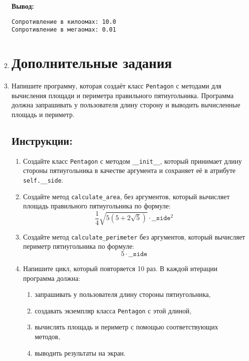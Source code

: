 \begin{enumerate}
\textbf{Вывод:}
\begin{verbatim}
Сопротивление в килоомах: 10.0
Сопротивление в мегаомах: 0.01
\end{verbatim}

\item 


\section*{Дополнительные задания}

\item
Напишите программу, которая создаёт класс \texttt{Pentagon} с методами для вычисления площади
и периметра правильного пятиугольника. Программа должна запрашивать у пользователя длину сторону
и выводить вычисленные площадь и периметр.

\subsection*{Инструкции:}
\begin{enumerate}
\item Создайте класс \texttt{Pentagon} с методом
\texttt{\_\_init\_\_}, который принимает длину стороны пятиугольника в
качестве аргумента и сохраняет её в атрибуте \texttt{self.\_\_side}.

\item Создайте метод \texttt{calculate\_area},
без аргументов, который вычисляет площадь правильного пятиугольника по формуле:
\[
\frac{1}{4} \sqrt{5(5 + 2\sqrt{5})} \cdot \texttt{\_\_side}^2
\]

\item Создайте метод \texttt{calculate\_perimeter} без аргументов,
который вычисляет периметр пятиугольника по формуле:
\[
5 \cdot \texttt{\_\_side}
\]

\item Напишите цикл, который повторяется 10 раз. В каждой итерации программа должна:
\begin{enumerate}
\item запрашивать у пользователя длину стороны пятиугольника,
\item создавать экземпляр класса \texttt{Pentagon} с этой длиной,
\item вычислять площадь и периметр с помощью соответствующих методов,
\item выводить результаты на экран.
\end{enumerate}
\end{enumerate}


\end{enumerate}
